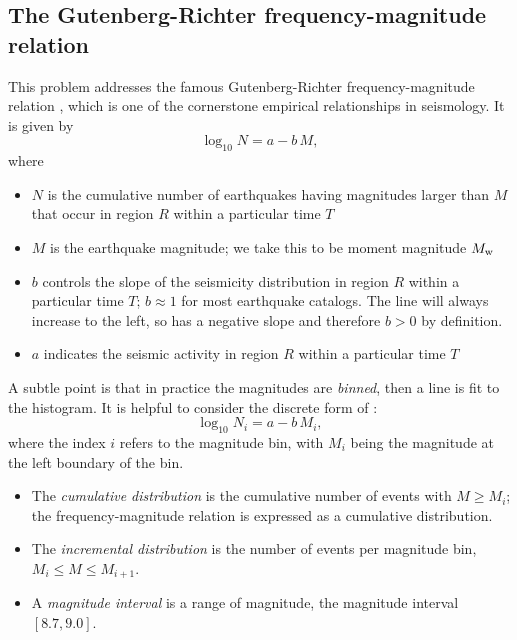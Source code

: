 \documentclass[11pt,titlepage,fleqn]{article}
\begin{document}

\subsection*{The Gutenberg-Richter frequency-magnitude relation}

This problem addresses the famous Gutenberg-Richter frequency-magnitude relation \citep{GutenbergRichter1944}, which is one of the cornerstone empirical relationships in seismology. It is given by
%
\begin{equation}
\log_{10} N = a - b\,M,
\label{GR}
\end{equation}
%
where
%
\begin{itemize}
\item $N$ is the cumulative number of earthquakes having magnitudes larger than $M$ that occur in region $R$ within a particular time $T$
\item $M$ is the earthquake magnitude; we take this to be moment magnitude $M_{\rm w}$
\item $b$ controls the slope of the seismicity distribution in region $R$ within a particular time $T$; $b \approx 1$ for most earthquake catalogs. The line will always increase to the left, so  has a negative slope and therefore $b > 0$ by definition.
\item $a$ indicates the seismic activity in region $R$ within a particular time $T$
\end{itemize}
%
A subtle point is that in practice the magnitudes are {\em binned}, then a line is fit to the histogram. It is helpful to consider the discrete form of :
%
\begin{equation}
\log_{10} N_i = a - b\,M_i,
\label{GRd}
\end{equation}
%
where the index $i$ refers to the magnitude bin, with $M_i$ being the magnitude at the left boundary of the bin.

\begin{itemize}
\item The {\em cumulative distribution} is the cumulative number of events with $M \ge M_i$; the frequency-magnitude relation is expressed as a cumulative distribution.
\item The {\em incremental distribution} is the number of events per magnitude bin, $M_i \le M \le M_{i+1}$.
\item A {\em magnitude interval} is a range of magnitude, \eg the magnitude interval $[8.7,9.0]$.
\end{itemize}
\end{document}
